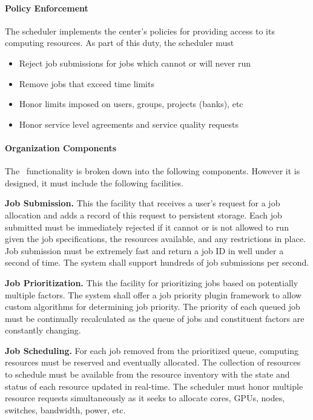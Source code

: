 \paragraph{Policy Enforcement}

The scheduler implements the center's policies for providing access to
its computing resources.  As part of this duty, the scheduler must

\begin{itemize}
  \item Reject job submissions for jobs which cannot or will never run
  \item Remove jobs that exceed time limits
  \item Honor limits imposed on users, groups, projects (banks), etc
  \item Honor service level agreements and service quality requests
\end{itemize}

\paragraph{Organization Components}

The \ngjs\ functionality is broken down into the following components.
However it is designed, it must include the following facilities.

\textbf{Job Submission.} This the facility that receives a user's
request for a job allocation and adds a record of this request to
persistent storage.  Each job submitted must be immediately rejected
if it cannot or is not allowed to run given the job specifications,
the resources available, and any restrictions in place.  Job
submission must be extremely fast and return a job ID in well under a
second of time.  The system shall support hundreds of job submissions
per second.

\textbf{Job Prioritization.}  This the facility for prioritizing jobs
based on potentially multiple factors.  The system shall offer a job
priority plugin framework to allow custom algorithms for determining
job priority.  The priority of each queued job must be continually
recalculated as the queue of jobs and constituent factors are
constantly changing.

\textbf{Job Scheduling.} For each job removed from the prioritized
queue, computing resources must be reserved and eventually allocated.
The collection of resources to schedule must be available from the
resource inventory with the state and status of each resource updated in
real-time.  The scheduler must honor multiple resource requests
simultaneously as it seeks to allocate cores, GPUs, nodes, switches,
bandwidth, power, etc.

